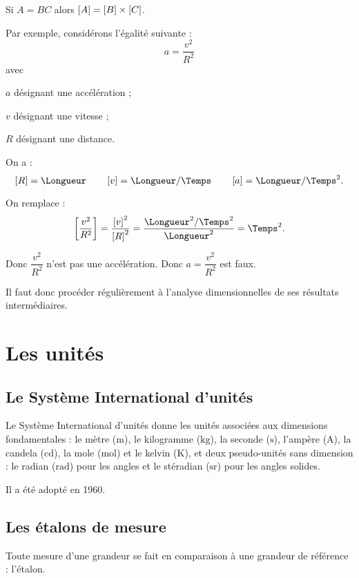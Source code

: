 Si \(A=BC\) alors \(\left[A\right]=\left[B\right]\times\left[C\right]\).

Par exemple, considérons l'égalité suivante : \[a=\dfrac{v^2}{R^2}\] avec \begin{description}
\item \(a\) désignant une accélération ;
\item \(v\) désignant une vitesse ;
\item \(R\) désignant une distance. \\
\end{description}

On a : \[\croch{R}=\unit{\Longueur}\qquad\croch{v}=\unit{\Longueur\per\Temps}\qquad\croch{a}=\unit{\Longueur\per\Temps\squared}.\]

On remplace : \[\croch{\dfrac{v^2}{R^2}}=\dfrac{\croch{v}^2}{\croch{R}^2}=\dfrac{\unit{\Longueur\squared\per\Temps\squared}}{\unit{\Longueur\squared}}=\unit{\per\Temps\squared}.\]

Donc \(\dfrac{v^2}{R^2}\) n'est pas une accélération. Donc \(a=\dfrac{v^2}{R^2}\) est faux.

Il faut donc procéder régulièrement à l'analyse dimensionnelles de ses résultats intermédiaires.

\section{Les unités}

\subsection{Le Système International d'unités}

Le Système International d'unités donne les unités associées aux dimensions fondamentales : le mètre (\(\unit{\meter}\)), le kilogramme (\(\unit{\kilo\gram}\)), la seconde (\(\unit{\second}\)), l'ampère (\(\unit{\ampere}\)), la candela (\(\unit{\candela}\)), la mole (\(\unit{\mole}\)) et le kelvin (\(\unit{\kelvin}\)), et deux pseudo-unités sans dimension : le radian (\(\unit{\radian}\)) pour les angles et le stéradian (\(\unit{\steradian}\)) pour les angles solides.

Il a été adopté en 1960.

\subsection{Les étalons de mesure}

Toute mesure d'une grandeur se fait en comparaison à une grandeur de référence : l'étalon.


